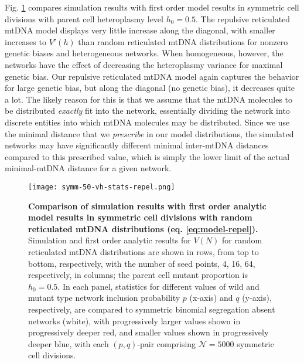 \documentclass{article}
\begin{document}
\begin{appendices}
\begin{figure}[!ht]
\end{figure}
Fig. \ref{fig:app-vh-stats-repel} compares simulation results with first order model results in symmetric cell divisions with parent cell heteroplasmy level $h_0=0.5$. The repulsive reticulated mtDNA model displays very little increase along the diagonal, with smaller increases to $V'(h)$ than random reticulated mtDNA distributions for nonzero genetic biases and heterogeneous networks. When homogeneous, however, the networks have the effect of decreasing the heteroplasmy variance for maximal genetic bias. Our repulsive reticulated mtDNA model again captures the behavior for large genetic bias, but along the diagonal (no genetic bias), it decreases quite a lot. The likely reason for this is that we assume that the mtDNA molecules to be distributed \textit{exactly} fit into the network, essentially dividing the network into discrete entities into which mtDNA molecules may be distributed. Since we use the minimal distance that we \textit{prescribe} in our model distributions, the simulated networks may have significantly different minimal inter-mtDNA distances compared to this prescribed value, which is simply the lower limit of the actual minimal-mtDNA distance for a given network.
\begin{figure}[!ht]
        \centering \texttt{[image: symm-50-vh-stats-repel.png]}
        \caption{\textbf{Comparison of simulation results with first order analytic model results in symmetric cell divisions with random reticulated mtDNA distributions (eq. \ref{eq:model-repel}).} Simulation and first order analytic results for $V(N)$ for random reticulated mtDNA distributions are shown in rows, from top to bottom, respectively, with the number of seed points, 4, 16, 64, respectively, in columns; the parent cell mutant proportion is $h_0=0.5$. In each panel, statistics for different values of wild and mutant type network inclusion probability $p$ (x-axis) and $q$ (y-axis), respectively, are compared to symmetric binomial segregation absent networks (white), with progressively larger values shown in progressively deeper red, and smaller values shown in progressively deeper blue, with each $(p,q)$-pair comprising $\mathcal{N}=5000$ symmetric cell divisions.}\label{fig:app-vh-stats-repel} 
\end{figure}

\end{appendices}
\end{document}
